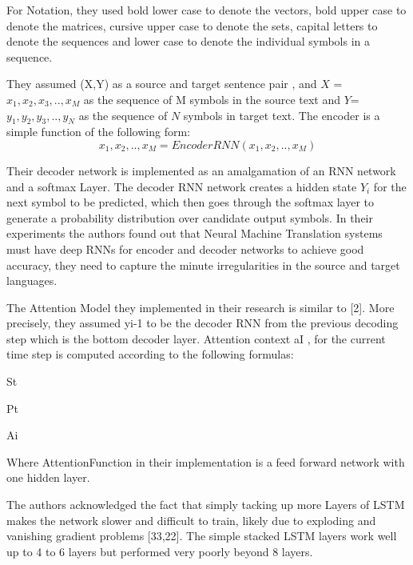 For Notation, they used bold lower case to denote the vectors, bold upper case to denote the matrices, cursive upper case to denote the sets, capital letters to denote the sequences and lower case to denote the individual symbols in a sequence. 

They assumed (X,Y) as a source and target sentence pair , and $X$ = $x_1,x_2,x_3,..,x_M$ as the sequence of M symbols in the source text and $Y$= $y_1,y_2,y_3,.., y_N$ as the sequence of $N$ symbols in target text. The encoder is a simple function of the following form:
$$x_1,x_2,..,x_M = EncoderRNN(x_1,x_2,..,x_M)$$

Their decoder network is implemented as an amalgamation of an RNN network and a softmax Layer. The decoder RNN network creates a hidden state $Y_i$ for the next symbol to be predicted, which then goes through the softmax layer to generate a probability distribution over candidate output symbols. In their experiments the authors found out that Neural Machine Translation systems must have deep RNNs for encoder and decoder networks to achieve good accuracy, they need to capture the minute irregularities in the source and target languages. 

The Attention Model they implemented in their research is similar to [2]. More precisely, they assumed yi-1 to be the decoder RNN from the previous decoding step which is the bottom decoder layer. Attention context aI , for the current time step is computed according to the following formulas:



St



Pt


Ai

Where AttentionFunction in their implementation is a feed forward network with one hidden layer.

The authors acknowledged the fact that simply tacking up more Layers of LSTM makes the network slower and difficult to train, likely due to exploding and vanishing gradient problems [33,22]. The simple stacked LSTM layers work well up to 4 to 6 layers but performed very poorly beyond 8 layers.

